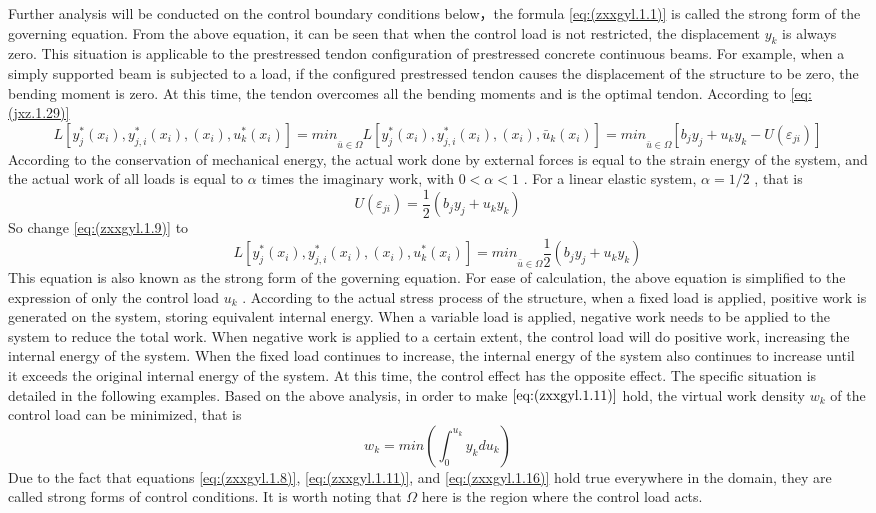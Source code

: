 Further analysis will be conducted on the control boundary conditions below，the formula \ref{eq:(zxxgyl.1.1)} is called the strong form of the governing equation. From the above equation, it can be seen that when the control load is not restricted, the displacement $ y_k $ is always zero. This situation is applicable to the prestressed tendon configuration of prestressed concrete continuous beams. For example, when a simply supported beam is subjected to a load, if the configured prestressed tendon causes the displacement of the structure to be zero, the bending moment is zero. At this time, the tendon overcomes all the bending moments and is the optimal tendon.
According to \ref{eq:(jxz.1.29)}
\begin{equation} \label{eq:(zxxgyl.1.13)}    
L[y^*_j(x_i),y^*_{j,i}(x_i),(x_i),u^*_k(x_i)] = min\underset{\bar u \in \Omega}{}L[y^*_j(x_i),y^*_{j,i}(x_i),(x_i),\bar {u}_k (x_i)]=min\underset{\bar u \in \Omega}{}[b_j y_j+u_k y_k-U(\varepsilon_{ji})]
\end{equation}
According to the conservation of mechanical energy, the actual work done by external forces is equal to the strain energy of the system, and the actual work of all loads is equal to $ \alpha $ times the imaginary work, with $ 0<\alpha<1 $ . For a linear elastic system, $ \alpha=1/2 $ , that is
\begin{equation} \label{eq:(zxxgyl.1.14)}  
U(\varepsilon_{ji})=\frac{1}{2} (b_j y_j+u_k y_k)
\end{equation}
So change \ref{eq:(zxxgyl.1.9)} to
\begin{equation} \label{eq:(zxxgyl.1.15)}    
L[y^*_j(x_i),y^*_{j,i}(x_i),(x_i),u^*_k(x_i)] =min\underset{\bar u \in \Omega}{}\frac{1}{2}(b_j y_j+u_k y_k)
\end{equation}
This equation is also known as the strong form of the governing equation.
For ease of calculation, the above equation is simplified to the expression of only the control load $ u_k $ . According to the actual stress process of the structure, when a fixed load is applied, positive work is generated on the system, storing equivalent internal energy. When a variable load is applied, negative work needs to be applied to the system to reduce the total work. When negative work is applied to a certain extent, the control load will do positive work, increasing the internal energy of the system. When the fixed load continues to increase, the internal energy of the system also continues to increase until it exceeds the original internal energy of the system. At this time, the control effect has the opposite effect. The specific situation is detailed in the following examples.
Based on the above analysis, in order to make $ \ref{eq:(zxxgyl.1.11)}$  hold, the virtual work density $ w_k $ of the control load can be minimized, that is
\begin{equation} \label{eq:(zxxgyl.1.16)}    
w_k=min(\int_{0}^{u_k} y_k  d u_k)
\end{equation}
Due to the fact that equations \ref{eq:(zxxgyl.1.8)}, \ref{eq:(zxxgyl.1.11)}, and \ref{eq:(zxxgyl.1.16)} hold true everywhere in the domain, they are called strong forms of control conditions. It is worth noting that $ \Omega $ here is the region where the control load acts.

